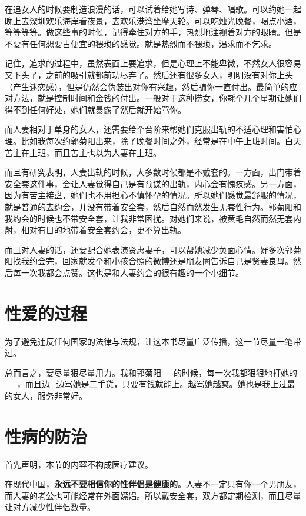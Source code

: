 在追女人的时候要制造浪漫的话，可以试着给她写诗、弹琴、唱歌。可以约她一起晚上去深圳欢乐海岸看夜景，去欢乐港湾坐摩天轮。可以吃烛光晚餐，喝点小酒，等等等等。做这些事的时候，记得牵住对方的手，热烈地注视着对方的眼睛。但是不要有任何想要占便宜的猥琐的感觉。就是热烈而不猥琐，渴求而不乞求。

记住，追求的过程中，虽然表面上要追求，但是心理上不能卑微，不然女人很容易又下头了，之前的吸引就都前功尽弃了。然后还有很多女人，明明没有对你上头（产生迷恋感），但是仍然会伪装出对你有兴趣，然后骗你一直付出。最简单的应对方法，就是控制时间和金钱的付出。一般对于这种捞女，你耗个几个星期让她们得不到任何好处，她们就暴露了然后就开始骂你。

而人妻相对于单身的女人，还需要给个台阶来帮她们克服出轨的不适心理和害怕心理。比如我每次约郭菊阳出来，除了晚餐时间之外，经常是在中午上班时间。白天苦主在上班，而且苦主也以为人妻在上班。

而且有研究表明，人妻出轨的时候，大多数时候都是不戴套的。一方面，出门带着安全套这件事，会让人妻觉得自己是有预谋的出轨，内心会有愧疚感。另一方面，因为有苦主接盘，她们也不用担心不慎怀孕的情况。所以她们感觉最舒服的情况，就是普通的去约会，并没有带着安全套，然后自然而然发生无套性行为。郭菊阳和我约会的时候也不带安全套，让我非常困扰。对她们来说，被黄毛自然而然无套内射，相对有目的地带着安全套约会，更不算出轨。

而且对人妻的话，还要配合她表演贤惠妻子，可以帮她减少负面心情。好多次郭菊阳找我约会完，回家就发个和小孩合照的微博还是朋友圈告诉自己是贤妻良母。然后每一次我都会点赞。这也是和人妻约会的很有趣的一个小细节。

\section{性爱的过程}

为了避免违反任何国家的法律与法规，让这本书尽量广泛传播，这一节尽量一笔带过。

总而言之，要尽量狠尽量用力。我和郭菊阳\_\_的时候，每一次我都狠狠地打她的\_\_，而且边\_边骂她是二手货，只要有钱就能上。越骂她越爽。她也是我上过最\_的女人，服务非常好。

\section{性病的防治}

首先声明，本节的内容不构成医疗建议。

在现代中国，\textbf{永远不要相信你的性伴侣是健康的}。人妻不一定只有你一个男朋友，而人妻的老公也可能经常在外面嫖娼。所以戴安全套，双方都定期检测，而且尽量让对方减少性伴侣数量。

